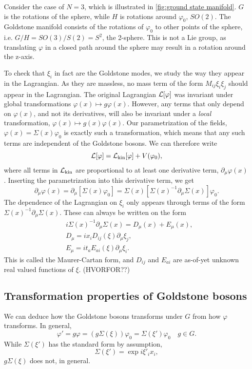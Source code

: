 Consider the case of $N = 3$, which is illustrated in \autoref{fig:ground state manifold}.
$G$ is the rotations of the sphere, while $H$ is rotations around $\varphi_0$, $SO(2)$.
The Goldstone manifold consists of the rotations of $\varphi_0$ to other points of the sphere, i.e. $G/H = SO(3)/S(2) = S^2$, the 2-sphere.
This is not a Lie group, as translating $\varphi$ in a closed path around the sphere may result in a rotation around the z-axis.


To check that $\xi_i$ in fact are the Goldstone modes, we study the way they appear in the Lagrangian.
As they are massless, no mass term of the form $M_{ij} \xi_i \xi_j$ should appear in the Lagrangian.
The original Lagrangian $\mathcal{L}[\varphi]$ was invariant under global transformations $\varphi(x) \mapsto g \varphi(x)$.
However, any terms that only depend on $\varphi(x)$, and not its derivatives, will also be invariant under a \emph{local} transformation, $\varphi(x) \mapsto g(x)\varphi(x)$.
Our parametrization of the fields, $\varphi(x) = \Sigma(x)\varphi_0$ is exactly such a transformation, which means that any such terms are independent of the Goldstone bosons.
We can therefore write
\begin{equation}
    \mathcal{L}[\varphi] = \mathcal{L}_{\mathrm{kin}}[\varphi] + V(\varphi_0),
\end{equation}
where all terms in $\mathcal{L}_{\mathrm{kin}}$ are proportional to at least one derivative term, $\partial_\mu \varphi(x)$.
Inserting the parametrization into this derivative term, we get
\begin{equation}
    \partial_\mu \varphi(x) = \partial_\mu [\Sigma(x) \varphi_0]
    = \Sigma(x) [\Sigma(x)^{-1} \partial_{\mu} \Sigma(x)] \varphi_0.
\end{equation}
The dependence of the Lagrangian on $\xi_i$ only appears through terms of the form $\Sigma(x)^{-1}\partial_\mu \Sigma(x)$.
These can always be written on the form
\begin{align*}
    & i\Sigma(x)^{-1}\partial_\mu \Sigma(x) = D_{\mu}(x) + E_{\mu}(x), \\
    & D_{\mu}  = i x_i D_{ij}(\xi) \partial_\mu \xi_j, \\
    & E_{\mu}  = i t_a E_{ai}(\xi)\partial_\mu \xi_i.
\end{align*}
This is called the Maurer-Cartan form, and $D_{ij}$ and $E_{ai}$ are as-of-yet unknown real valued functions of $\xi$. (HVORFOR??)


\subsection*{Transformation properties of Goldstone bosons}
We can deduce how the Goldstone bosons transforms under $G$ from how $\varphi$ transforms.
In general, 
\begin{equation}
    \varphi' = g \varphi = (g \Sigma(\xi)) \varphi_0 = \Sigma(\xi') \varphi_0 \quad g \in G.
\end{equation}
While $\Sigma(\xi')$ has the standard form by assumption,
\begin{equation}
    \Sigma(\xi') = \exp{i \xi'_i x_i},
\end{equation}
$g\Sigma(\xi)$ does not, in general.

